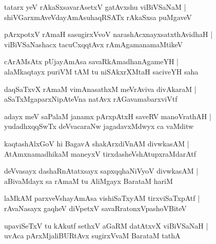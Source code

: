\begin{shloka}
tatarx yeV rAkaSxsavarAsetxV gatAvxshu viBiVSaNaM |\\
shiVGarxmAveVdayAmAsuhaqRSATx rAkaSxsa puMgaveV 
\end{shloka}

\begin{shloka}
pArxpotxV rAmaH sasugirxVvoV narashAcxnayxsatxthAvidhaH |\\
viBiVSaNashacx tacuCxqqtAvx rAmAgamanamaMtikeV 
\end{shloka}

\begin{shloka}
cArAMsAtx\R{} pUjayAmAsa savaRkAmadhanAgameYH |\\
alaMkaqtayx puriVM tAM tu niSAkxrXMtaH saciveYH saha
\end{shloka}

\begin{shloka}
daqSaTxvX rAmaM vimAnasathxM meVrAviva divAkaraM |\\
aSaTxMgaparxNipAteVna natAvx rAGavamabarxviVtf 
\end{shloka}

\begin{shloka}
adayx meV saPalaM janamx pArxpAtxH saveRV manoVrathAH |\\
yudadhxqqSwTx deVvacaraNw jagadavxMdwyx ca vaMditw
\end{shloka}

\begin{shloka}
kaqtashAlxGoV hi BagavA\R{} shakArxdiVnAM divwkasAM |\\
AtAmxnamadhikaM maneyxV tirxdasheVshAtupxraMdarAtf
\end{shloka}

\begin{shloka}
deVvasayx dashaRnAtatxsayx sapxqqhaNiVyoV divwkasAM |\\
aBivaMdayx sa rAmaM tu AliMgayx BarataM hariM 
\end{shloka}

\begin{shloka}
laMkAM parxveVshayAmAsa vishiSaTxyAM tirxviSaTxpAtf |\\
rAvaNasayx gaqheV diVpetxV savaRratonxVpashoVBiteV 
\end{shloka}

\begin{shloka}
upaviSeTxV tu kAkutf sethxV aGaRM datAtxvX viBiVSaNaH |\\
uvAca pArxMjaliBURtAvx sugirxVvaM BarataM tathA 
\end{shloka}


